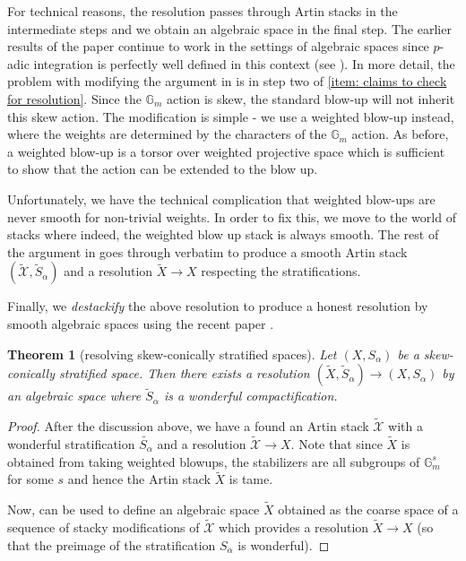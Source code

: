 \documentclass[10pt]{article}
\theoremstyle{plain}
\newtheorem{thm}[theorem]{Theorem}
\theoremstyle{definition}
\numberwithin{equation}{section}
\begin{document}
For technical reasons, the resolution passes through Artin stacks in the intermediate steps and we obtain an algebraic space in the final step. The earlier results of the paper continue to work in the settings of algebraic spaces since $p$-adic integration is perfectly well defined in this context (see \cite[\S2.1]{groechenig2020geometric} ). In more detail, the problem with modifying the argument in \cite{macpherson1998making} is in step two of \ref{item: claims to check for resolution}. Since the $\mathbb G_m$ action is skew, the standard blow-up will not inherit this skew action. The modification is simple - we use a weighted blow-up instead, where the weights are determined by the characters of the $\mathbb G_m$ action. As before, a weighted blow-up is a torsor over weighted projective space which is sufficient to show that the action can be extended to the blow up.

Unfortunately, we have the technical complication that weighted blow-ups are never smooth for non-trivial weights. In order to fix this, we move to the world of stacks where indeed, the weighted blow up stack is always smooth. The rest of the argument in \cite{macpherson1998making} goes through verbatim to produce a smooth Artin stack $(\tilde{\mathscr X},\tilde S_\alpha)$ and a resolution $\tilde{X} \to X$ respecting the stratifications.


Finally, we \emph{destackify} the above resolution to produce a honest resolution by smooth algebraic spaces using the recent paper \cite{bergh2019functorial}.

\begin{thm}[resolving skew-conically stratified spaces]
    Let $(X,S_\alpha)$ be a skew-conically stratified space. Then there exists a resolution $(\tilde{X},\tilde{S}_\alpha) \to (X,S_\alpha)$ by an algebraic space where $\tilde S_\alpha$ is a wonderful compactification.
\end{thm}
\begin{proof}
    After the discussion above, we have a found an Artin stack $\tilde{\mathscr X}$ with a wonderful stratification $\tilde{S_\alpha}$ and a resolution $\tilde{\mathscr X} \to X$. Note that since $\tilde{X}$ is obtained from taking weighted blowups, the stabilizers are all subgroups of $\mathbb G_m^s$ for some $s$ and hence the Artin stack $\tilde X$ is tame.

    Now, \cite[Theorem B]{bergh2019functorial} can be used to define an algebraic space $\tilde{X}$ obtained as the coarse space of a sequence of stacky modifications of $\tilde{\mathscr X}$ which provides a resolution $\tilde X \to X$ (so that the preimage of the stratification $S_\alpha$ is wonderful).
\end{proof}
\end{document}
